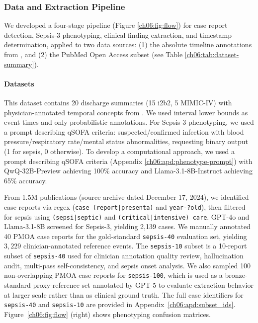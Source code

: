 \subsubsection{Data and Extraction Pipeline}
We developed a four-stage pipeline (Figure \ref{ch06:fig:flow}) for case report detection, Sepsis-3 phenotyping, clinical finding extraction, and timestamp determination, applied to two data sources: (1) the absolute timeline annotations from \cite{ch06:frattallone2024using}, and (2) the PubMed Open Access subset \citep{pmc2024open} (see Table \ref{ch06:tab:dataset-summary}).





\paragraph{Datasets}
\label{ch06:section:datasets}

 This dataset contains 20 discharge summaries (15 i2b2, 5 MIMIC-IV) with physician-annotated temporal concepts from \cite{ch06:frattallone2024using}. We used interval lower bounds as event times and only probabilistic annotations. For Sepsis-3 phenotyping, we used a prompt describing qSOFA criteria: suspected/confirmed infection with blood pressure/respiratory rate/mental status abnormalities, requesting binary output (1 for sepsis, 0 otherwise).
To develop a computational approach, we used a prompt describing qSOFA criteria (Appendix \ref{ch06:apd:phenotype-prompt}) with QwQ-32B-Preview achieving 100\% accuracy and Llama-3.1-8B-Instruct achieving 65\% accuracy.

From 1.5M publications (source archive dated December 17, 2024), we identified case reports via regex (\texttt{case (report|presenta)} and \texttt{year-?old}), then filtered for sepsis using \texttt{(sepsi|septic)} and \texttt{(critical|intensive) care}.
GPT-4o and Llama-3.1-8B screened for Sepsis-3, yielding 2,139 cases.
We manually annotated 40 PMOA case reports for the gold-standard \texttt{sepsis-40} evaluation set, yielding $3,229$ clinician-annotated reference events.
The \texttt{sepsis-10} subset is a 10-report subset of \texttt{sepsis-40} used for clinician annotation quality review, hallucination audit, multi-pass self-consistency, and sepsis onset analysis.
We also sampled 100 non-overlapping PMOA case reports for \texttt{sepsis-100}, which is used as a bronze-standard proxy-reference set annotated by GPT-5 to evaluate extraction behavior at larger scale rather than as clinical ground truth.
The full case identifiers for \texttt{sepsis-40} and \texttt{sepsis-10} are provided in Appendix~\ref{ch06:apd:subset_ids}.
Figure~\ref{ch06:fig:flow} (right) shows phenotyping confusion matrices.

